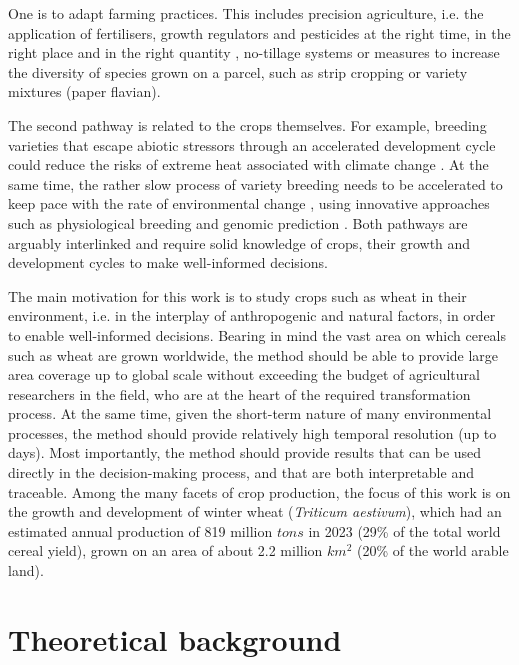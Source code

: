 One is to adapt farming practices. This includes precision agriculture, i.e. the application of fertilisers, growth regulators and pesticides at the right time, in the right place and in the right quantity \citep{finger_precision_2019}, no-tillage systems \citep{triplett_notillage_2008} or measures to increase the diversity of species grown on a parcel, such as strip cropping \citep{juventia_spatio-temporal_2022} or variety mixtures (paper flavian).

The second pathway is related to the crops themselves. For example, breeding varieties that escape abiotic stressors through an accelerated development cycle could reduce the risks of extreme heat associated with climate change \citep{rezaei_climate_2018, rogger_can_2021}. At the same time, the rather slow process of variety breeding needs to be accelerated to keep pace with the rate of environmental change \citep{zhang_climate_2022}, using innovative approaches such as physiological breeding \citep{reynolds_physiological_2016} and genomic prediction \citep{desta_genomic_2014}. Both pathways are arguably interlinked and require solid knowledge of crops, their growth and development cycles to make well-informed decisions.

The main motivation for this work is to study crops such as wheat in their environment, i.e. in the interplay of anthropogenic and natural factors, in order to enable well-informed decisions. Bearing in mind the vast area on which cereals such as wheat are grown worldwide, the method should be able to provide large area coverage up to global scale without exceeding the budget of agricultural researchers in the field, who are at the heart of the required transformation process. At the same time, given the short-term nature of many environmental processes, the method should provide relatively high temporal resolution (up to days). Most importantly, the method should provide results that can be used directly in the decision-making process, and that are both interpretable and traceable. Among the many facets of crop production, the focus of this work is on the growth and development of winter wheat (\textsl{Triticum aestivum}), which had an estimated annual production of 819 million $tons$ in 2023 (29\% of the total world cereal yield), grown on an area of about 2.2 million $km^2$ (20\% of the world arable land).

\section{Theoretical background}
